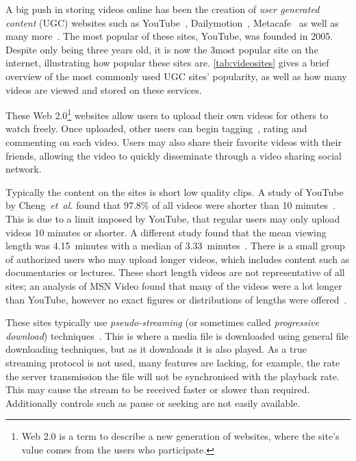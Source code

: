     A big push in storing videos online has been the creation of \emph{user generated content} (UGC) websites such as YouTube~\cite{youtube}, Dailymotion~\cite{dailymotion}, Metacafe~\cite{metacafe} as well as many more~\cite{msnvideo,googlevideo,hulu,myspacetv}. The most popular of these sites, YouTube, was founded in 2005. Despite only being three years old, it is now the 3\rd most popular site on the internet, illustrating how popular these sites are. \autoref{tab:videosites} gives a brief overview of the most commonly used UGC sites' popularity, as well as how many videos are viewed and stored on these services.

    These Web 2.0\footnote{Web 2.0 is a term to describe a new generation of websites, where the site's value comes from the users who participate.} websites allow users to upload their own videos for others to watch freely. Once uploaded, other users can begin tagging~\cite{ames2007wtm}, rating and commenting on each video. Users may also share their favorite videos with their friends, allowing the video to quickly disseminate through a video sharing social network.

    Typically the content on the sites is short low quality clips. A study of YouTube by Cheng~\emph{et~al.} found that 97.8\% of all videos were shorter than 10 minutes~\cite{cheng2007uci}. This is due to a limit imposed by YouTube, that regular users may only upload videos 10 minutes or shorter. A different study found that the mean viewing length was 4.15~minutes with a median of 3.33~minutes~\cite{gill2007ytc}. There is a small group of authorized users who may upload longer videos, which includes content such as documentaries or lectures. These short length videos are not representative of all sites; an analysis of MSN Video found that many of the videos were a lot longer than YouTube, however no exact figures or distributions of lengths were offered~\cite{huang2007civ}.

    These sites typically use \emph{pseudo-streaming} (or sometimes called \emph{progressive download}) techniques~\cite{guo2005amw}. This is where a media file is downloaded using general file downloading techniques, but as it downloads it is also played. As a true streaming protocol is not used, many features are lacking, for example, the rate the server transmission the file will not be synchronised with the playback rate. This may cause the stream to be received faster or slower than required. Additionally controls such as pause or seeking are not easily available.

